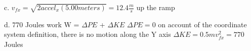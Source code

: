 c. $v_{fx} = \sqrt{2accel_{x}(5.00 meters)} = 12.4 \frac{m}{s}$ up the ramp\newline

d. $770$ Joules\newline
work W = $\Delta PE$ + $\Delta KE$\newline
$\Delta PE = 0$ on account of the coordinate\newline
system definition, there is no motion along\newline
the Y axis\newline
$\Delta KE = 0.5mv_{fx}^{2} = 770$ Joules\newline

